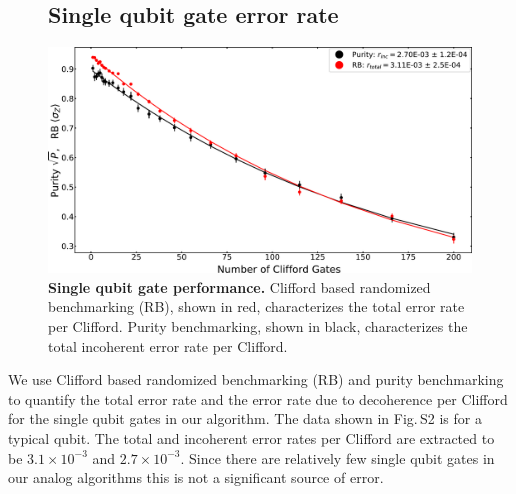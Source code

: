 \begin{figure}
\subsection{Single qubit gate error rate}
\centering
\includegraphics[width=140mm, keepaspectratio]{./PDF/RB_supp_190530_1105a.pdf}
\caption{\textbf{Single qubit gate performance.}  Clifford based randomized benchmarking (RB), shown in red, characterizes the total error rate per Clifford.  Purity benchmarking, shown in black, characterizes the total incoherent error rate per Clifford.}
\end{figure}

We use Clifford based randomized benchmarking (RB) and purity benchmarking to quantify the total error rate and the error rate due to decoherence per Clifford for the single qubit gates in our algorithm.
The data shown in Fig.\,S2 is for a typical qubit.  The total and incoherent error rates per Clifford are extracted to be $3.1 \times 10^{-3}$ and $2.7 \times 10^{-3}$.
Since there are relatively few single qubit gates in our analog algorithms this is not a significant source of error.

